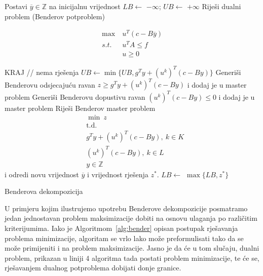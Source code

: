 \documentclass[a4paper, utf8, 11pt, colorlinks]{book}
\theoremstyle{definition}
\begin{document}
 \begin{algorithm}[H] \label{alg:bender}
 	\begin{algorithmic}[1] 
 		\STATE Postavi $\overline{y}\in\mathbb{Z}$ na inicijalnu vrijednost
 		\STATE 	$LB \gets$ $-\infty$; $UB \gets$ $+\infty$
 		\STATE Riješi dualni problem (Benderov potproblem)
 		
 		$$	\begin{aligned}
 			\max\ &u^T (c-B\overline{y})\\
 			s.t.\ &u^TA\leqslant f\\
 			&u\geqslant 0
 			\end{aligned}$$
 		
 		\STATE  KRAJ // nema  rješenja  
 		\ENDIF
 		\STATE $UB \gets \min\{UB,g^Ty+(u^k)^T(c-By)\}$
 		\STATE Generiši Benderovu odsjecajuću ravan $z\geqslant g^Ty+(u^k)^T(c-By)$ i dodaj je u master problem
 		\ENDIF
		\STATE Generiši Benderovu dopustivu ravan 	$(u^k)^T(c-By)\leqslant 0$ i dodaj je u master problem
		\ENDIF
		\STATE Riješi Benderov master problem
			$$\begin{aligned}
			&\min\ z\\
			&\mbox{t.d.}\\
			& g^Ty+(u^k)^T(c-By), \ k \in K\\
			& (u^k)^T(c-By), \ k \in L\\
			&y \in \mathbb{Z}
		\end{aligned}$$
			i odredi novu vrijednost $\overline{y}$ i vrijednost rješenja $z^*$.
		\STATE $LB \gets$ $\max\{LB,z^*\}$
 		\ENDWHILE
 	\end{algorithmic}
 	\caption{Benderova dekompozicija}\label{alg:bender}
 \end{algorithm}



U primjeru kojim ilustrujemo upotrebu Benderove dekompozicije posmatramo jedan jednostavan problem maksimizacije dobiti na osnovu ulaganja po različitim kriterijumima.
Iako je Algoritmom~\ref{alg:bender} opisan postupak rješavanja problema minimizacije, algoritam se vrlo lako može preformulisati tako da se može primijeniti i na problem maksimizacije. Jasno je da će u tom slučaju, dualni problem, prikazan u liniji 4 algoritma tada postati problem minimizacije, te će se, rješavanjem dualnog potproblema dobijati donje granice.
\end{document}

